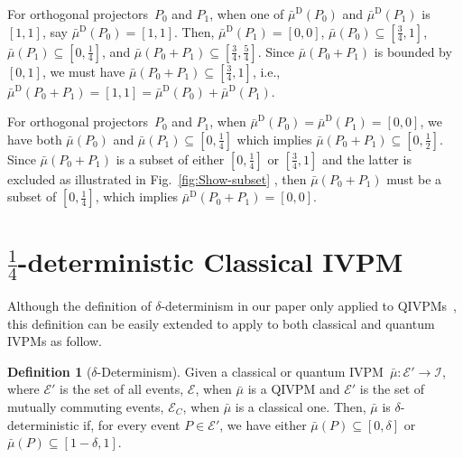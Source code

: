 \documentclass[english,reprint, aps, prl,superscriptaddress, showpacs,
showkeys, longbibliography, amsmath, amssymb, floatfix]{revtex4-1}
\theoremstyle{plain}
\theoremstyle{definition}
\newtheorem{definition}{Definition}
\newcommand{\events}{\ensuremath{\mathcal{E}}}
\newcommand{\imposs}{\ensuremath{\left[0,0\right]}}
\newcommand{\necess}{\ensuremath{\left[1,1\right]}}
\newcommand{\eventsC}{\ensuremath{\events_{C}}}
\begin{document}
For orthogonal projectors~$P_{0}$ and $P_{1}$, when one of $\bar{\mu}^{\textrm{D}}\left(P_{0}\right)$
and $\bar{\mu}^{\textrm{D}}\left(P_{1}\right)$ is $\necess$, say
$\bar{\mu}^{\textrm{D}}\left(P_{0}\right)=\necess$. Then, $\bar{\mu}^{\textrm{D}}\left(P_{1}\right)=\imposs$,
$\bar{\mu}\left(P_{0}\right)\subseteq\left[\frac{3}{4},1\right]$,
$\bar{\mu}\left(P_{1}\right)\subseteq\left[0,\frac{1}{4}\right]$,
and $\bar{\mu}\left(P_{0}+P_{1}\right)\subseteq\left[\frac{3}{4},\frac{5}{4}\right]$.
Since $\bar{\mu}\left(P_{0}+P_{1}\right)$ is bounded by $\left[0,1\right]$,
we must have $\bar{\mu}\left(P_{0}+P_{1}\right)\subseteq\left[\frac{3}{4},1\right]$,
i.e., $\bar{\mu}^{\textrm{D}}\left(P_{0}+P_{1}\right)=\necess=\bar{\mu}^{\textrm{D}}\left(P_{0}\right)+\bar{\mu}^{\textrm{D}}\left(P_{1}\right)$.

For orthogonal projectors~$P_{0}$ and $P_{1}$, when $\bar{\mu}^{\textrm{D}}\left(P_{0}\right)=\bar{\mu}^{\textrm{D}}\left(P_{1}\right)=\imposs$,
we have both $\bar{\mu}\left(P_{0}\right)$ and $\bar{\mu}\left(P_{1}\right)\subseteq\left[0,\frac{1}{4}\right]$
which implies $\bar{\mu}\left(P_{0}+P_{1}\right)\subseteq\left[0,\frac{1}{2}\right]$.
Since $\bar{\mu}\left(P_{0}+P_{1}\right)$ is a subset of either $\left[0,\frac{1}{4}\right]$
or $\left[\tfrac{3}{4},1\right]$ and the latter is excluded as illustrated
in Fig.~\ref{fig:Show-subset} , then $\bar{\mu}\left(P_{0}+P_{1}\right)$
must be a subset of $\left[0,\frac{1}{4}\right]$, which implies $\bar{\mu}^{\textrm{D}}\left(P_{0}+P_{1}\right)=\imposs$.

\section{\texorpdfstring{$\frac{1}{4}$}{¼}-deterministic Classical IVPM}

\label{sec:Classical-=0000BC-deterministic}

Although the definition of $\delta$-determinism in our paper only
applied to QIVPMs~\cite{THOS2017}, this definition can be easily
extended to apply to both classical and quantum IVPMs as follow.

\begin{definition}[$\delta$-Determinism]\label{def:delta-deterministic}
Given a classical or quantum IVPM~$\bar{\mu}:\events'\rightarrow\mathscr{I}$,
where $\events'$ is the set of all events, $\events$, when $\bar{\mu}$
is a QIVPM and $\events'$ is the set of mutually commuting events,
$\eventsC$, when $\bar{\mu}$ is a classical one. Then, $\bar{\mu}$
is $\delta$-deterministic if, for every event $P\in\events'$, we
have either $\bar{\mu}\left(P\right)\subseteq\left[0,\delta\right]$
or $\bar{\mu}\left(P\right)\subseteq\left[1-\delta,1\right]$. \end{definition}
\end{document}
